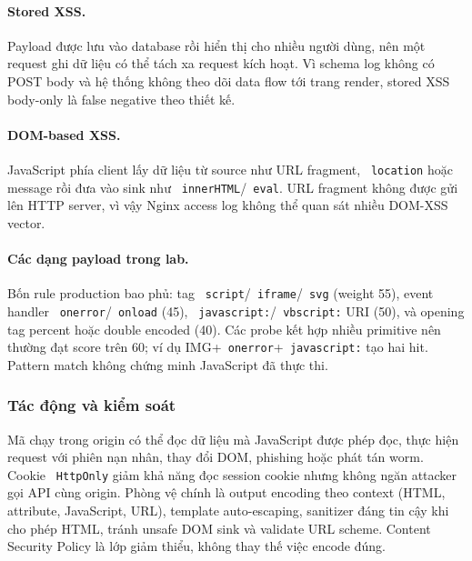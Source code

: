 \documentclass[runningheads]{report-template/llncs}
\newcommand{\code}[1]{\texttt{\small\hyphenchar\font=45 #1}}
\begin{document}
\paragraph{Stored XSS.}
Payload được lưu vào database rồi hiển thị cho nhiều người dùng, nên một
request ghi dữ liệu có thể tách xa request kích hoạt. Vì schema log không
có POST body và hệ thống không theo dõi data flow tới trang render, stored
XSS body-only là false negative theo thiết kế.

\paragraph{DOM-based XSS.}
JavaScript phía client lấy dữ liệu từ source như URL fragment,
\code{location} hoặc message rồi đưa vào sink như
\code{innerHTML}/\code{eval}. URL fragment không được gửi lên HTTP server,
vì vậy Nginx access log không thể quan sát nhiều DOM-XSS vector.

\paragraph{Các dạng payload trong lab.}
Bốn rule production bao phủ: tag \code{script}/\code{iframe}/\code{svg}
(weight 55), event handler \code{onerror}/\code{onload} (45),
\code{javascript:}/\code{vbscript:} URI (50), và opening tag percent hoặc
double encoded (40). Các probe kết hợp nhiều primitive nên thường đạt
score trên 60; ví dụ IMG+\code{onerror}+\code{javascript:} tạo hai hit.
Pattern match không chứng minh JavaScript đã thực thi.

\subsubsection{Tác động và kiểm soát}

Mã chạy trong origin có thể đọc dữ liệu mà JavaScript được phép đọc,
thực hiện request với phiên nạn nhân, thay đổi DOM, phishing hoặc phát
tán worm. Cookie \code{HttpOnly} giảm khả năng đọc session cookie nhưng
không ngăn attacker gọi API cùng origin. Phòng vệ chính là output encoding
theo context (HTML, attribute, JavaScript, URL), template auto-escaping,
sanitizer đáng tin cậy khi cho phép HTML, tránh unsafe DOM sink và validate
URL scheme. Content Security Policy là lớp giảm thiểu, không thay thế việc
encode đúng.
\end{document}

